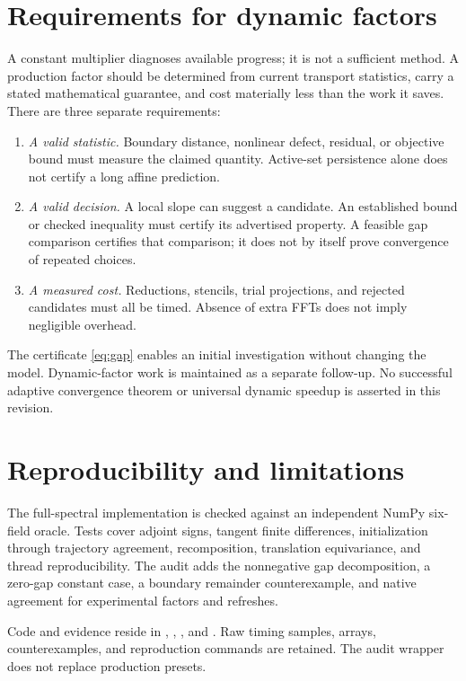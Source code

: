 \documentclass[10pt,twocolumn]{article}
\theoremstyle{definition}\newtheorem{remark}[proposition]{Remark}
\begin{document}
\section{Requirements for dynamic factors}
A constant multiplier diagnoses available progress; it is not a sufficient
method. A production factor should be determined from current transport
statistics, carry a stated mathematical guarantee, and cost materially
less than the work it saves. There are three separate requirements:
\begin{enumerate}
\item \emph{A valid statistic.} Boundary distance, nonlinear defect,
residual, or objective bound must measure the claimed quantity.
Active-set persistence alone does not certify a long affine prediction.
\item \emph{A valid decision.} A local slope can suggest a candidate.
An established bound or checked inequality must certify its advertised
property. A feasible gap comparison certifies that comparison; it does not
by itself prove convergence of repeated choices.
\item \emph{A measured cost.} Reductions, stencils, trial projections,
and rejected candidates must all be timed. Absence of extra FFTs does not
imply negligible overhead.
\end{enumerate}
The certificate \eqref{eq:gap} enables an initial investigation without
changing the model. Dynamic-factor work is maintained as a separate
follow-up. No successful adaptive convergence theorem or universal dynamic
speedup is asserted in this revision.

\section{Reproducibility and limitations}
The full-spectral implementation is checked against an independent NumPy
six-field oracle. Tests cover adjoint signs, tangent finite differences,
initialization through trajectory agreement, recomposition, translation
equivariance, and thread reproducibility. The audit adds the nonnegative
gap decomposition, a zero-gap constant case, a boundary remainder
counterexample, and native agreement for experimental factors and refreshes.

{\small\raggedright Code and evidence reside in
,
,
, and
.
Raw timing samples, arrays, counterexamples, and reproduction commands are
retained. The audit wrapper does not replace production presets.\par}
\end{document}
